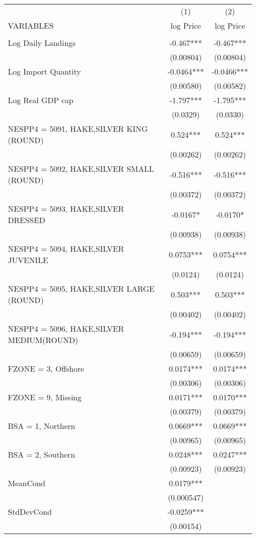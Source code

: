 \begin{tabular}{lcc} \hline
 & (1) & (2) \\
VARIABLES & log Price & log Price \\ \hline
 &  &  \\
Log Daily Landings & -0.467*** & -0.467*** \\
 & (0.00804) & (0.00804) \\
Log Import Quantity & -0.0464*** & -0.0466*** \\
 & (0.00580) & (0.00582) \\
Log Real GDP cap & -1.797*** & -1.795*** \\
 & (0.0329) & (0.0330) \\
NESPP4 = 5091, HAKE,SILVER KING (ROUND) & 0.524*** & 0.524*** \\
 & (0.00262) & (0.00262) \\
NESPP4 = 5092, HAKE,SILVER SMALL (ROUND) & -0.516*** & -0.516*** \\
 & (0.00372) & (0.00372) \\
NESPP4 = 5093, HAKE,SILVER DRESSED & -0.0167* & -0.0170* \\
 & (0.00938) & (0.00938) \\
NESPP4 = 5094, HAKE,SILVER JUVENILE & 0.0753*** & 0.0754*** \\
 & (0.0124) & (0.0124) \\
NESPP4 = 5095, HAKE,SILVER LARGE (ROUND) & 0.503*** & 0.503*** \\
 & (0.00402) & (0.00402) \\
NESPP4 = 5096, HAKE,SILVER MEDIUM(ROUND) & -0.194*** & -0.194*** \\
 & (0.00659) & (0.00659) \\
FZONE = 3, Offshore & 0.0174*** & 0.0174*** \\
 & (0.00306) & (0.00306) \\
FZONE = 9, Missing & 0.0171*** & 0.0170*** \\
 & (0.00379) & (0.00379) \\
BSA = 1, Northern & 0.0669*** & 0.0669*** \\
 & (0.00965) & (0.00965) \\
BSA = 2, Southern & 0.0248*** & 0.0247*** \\
 & (0.00923) & (0.00923) \\
MeanCond & 0.0179*** &  \\
 & (0.000547) &  \\
StdDevCond & -0.0259*** &  \\
 & (0.00154) &  \\

\end{tabular}
